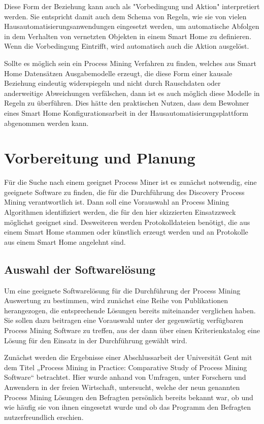 Diese Form der Beziehung kann auch als "Vorbedingung und Aktion" interpretiert werden. Sie entspricht damit auch dem Schema von Regeln, wie sie von vielen Hausautomatisierungsanwendungen eingesetzt werden, um automatische Abfolgen in dem Verhalten von vernetzten Objekten in einem Smart Home zu definieren. Wenn die Vorbedingung Eintrifft, wird automatisch auch die Aktion ausgelöst.

Sollte es möglich sein ein Process Mining Verfahren zu finden, welches aus Smart Home Datensätzen Ausgabemodelle erzeugt, die diese Form einer kausale Beziehung eindeutig widerspiegeln und nicht durch Rauschdaten oder anderweitige Abweichungen verfälschen, dann ist es auch möglich diese Modelle in Regeln zu überführen. Dies hätte den praktischen Nutzen, dass dem Bewohner eines Smart Home Konfigurationsarbeit in der Hausautomatisierungsplattform abgenommen werden kann.

\section{Vorbereitung und Planung}\label{sec:prep}
Für die Suche nach einem geeignet Process Miner ist es zunächst notwendig, eine geeignete Software zu finden, die für die Durchführung des Discovery Process Mining verantwortlich ist. 
Dann soll eine Vorauswahl an Process Mining Algorithmen identifiziert werden, die für den hier skizzierten Einsatzzweck möglichst geeignet sind. Desweiteren werden Protokolldateien benötigt, die aus einem Smart Home stammen oder künstlich erzeugt werden und an Protokolle aus einem Smart Home angelehnt sind.

\subsection{Auswahl der Softwarelösung}
Um eine geeignete Softwarelösung für die Durchführung der Process Mining Auswertung zu bestimmen, wird zunächst eine Reihe von Publikationen herangezogen, die entsprechende Lösungen bereits miteinander verglichen haben. Sie sollen dazu beitragen eine Vorauswahl unter der gegenwärtig verfügbaren Process Mining Software zu treffen, aus der dann über einen Kriterienkatalog eine Lösung für den Einsatz in der Durchführung gewählt wird. 

Zunächst werden die Ergebnisse einer Abschlussarbeit der Universität Gent mit dem Titel „Process Mining in Practice: Comparative Study of Process Mining Software“ \cite{verstraete} betrachtet. Hier wurde anhand von Umfragen, unter Forschern und Anwendern in der freien Wirtschaft, untersucht, welche der neun genannten Process Mining Lösungen den Befragten persönlich bereits bekannt war, ob und wie häufig sie von ihnen eingesetzt wurde und ob das Programm den Befragten nutzerfreundlich erschien.

